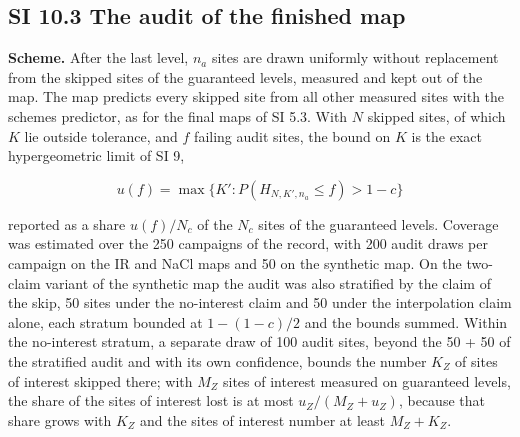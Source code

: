 \documentclass{iopjournal}
\begin{document}
\hypertarget{si-10.3-the-audit-of-the-finished-map}{%
\subsection*{SI 10.3 The audit of the finished map}\label{si-10.3-the-audit-of-the-finished-map}}

\textbf{Scheme.} After the last level, \(n_a\) sites are drawn uniformly without replacement from the skipped sites of the guaranteed levels, measured and kept out of the map. The map predicts every skipped site from all other measured sites with the scheme\textquotesingle s predictor, as for the final maps of SI 5.3. With \(N\) skipped sites, of which \(K\) lie outside tolerance, and \(f\) failing audit sites, the bound on \(K\) is the exact hypergeometric limit of SI 9,

\[
u(f) = \max \{ K' : P(H_{N, K', n_a} \le f) > 1 - c \}
\]

reported as a share \(u(f)/N_c\) of the \(N_c\) sites of the guaranteed levels. Coverage was estimated over the 250 campaigns of the record, with 200 audit draws per campaign on the IR and NaCl maps and 50 on the synthetic map. On the two-claim variant of the synthetic map the audit was also stratified by the claim of the skip, 50 sites under the no-interest claim and 50 under the interpolation claim alone, each stratum bounded at \(1 - (1 - c)/2\) and the bounds summed. Within the no-interest stratum, a separate draw of 100 audit sites, beyond the 50 + 50 of the stratified audit and with its own confidence, bounds the number \(K_Z\) of sites of interest skipped there; with \(M_Z\) sites of interest measured on guaranteed levels, the share of the sites of interest lost is at most \(u_Z/(M_Z + u_Z)\), because that share grows with \(K_Z\) and the sites of interest number at least \(M_Z + K_Z\).
\end{document}
